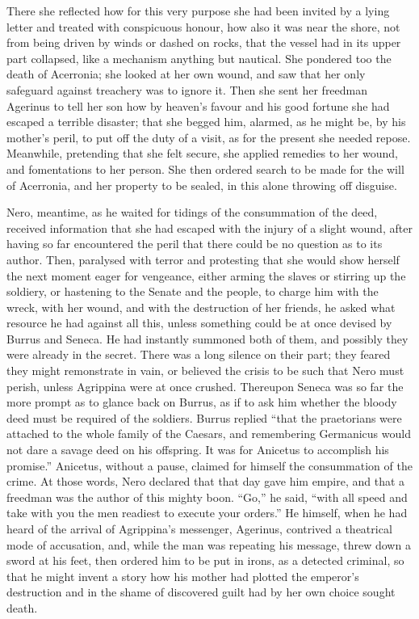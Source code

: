 
There she reflected how for this very purpose she had been invited by a lying letter and treated with conspicuous honour, how also it was near the shore, not from being driven by winds or dashed on rocks, that the vessel had in its upper part collapsed, like a mechanism anything but nautical. She pondered too the death of Acerronia; she looked at her own wound, and saw that her only safeguard against treachery was to ignore it. Then she sent her freedman Agerinus to tell her son how by heaven's favour and his good fortune she had escaped a terrible disaster; that she begged him, alarmed, as he might be, by his mother's peril, to put off the duty of a visit, as for the present she needed repose. Meanwhile, pretending that she felt secure, she applied remedies to her wound, and fomentations to her person. She then ordered search to be made for the will of Acerronia, and her property to be sealed, in this alone throwing off disguise.


Nero, meantime, as he waited for tidings of the consummation of the deed, received information that she had escaped with the injury of a slight wound, after having so far encountered the peril that there could be no question as to its author. Then, paralysed with terror and protesting that she would show herself the next moment eager for vengeance, either arming the slaves or stirring up the soldiery, or hastening to the Senate and the people, to charge him with the wreck, with her wound, and with the destruction of her friends, he asked what resource he had against all this, unless something could be at once devised by Burrus and Seneca. He had instantly summoned both of them, and possibly they were already in the secret. There was a long silence on their part; they feared they might remonstrate in vain, or believed the crisis to be such that Nero must perish, unless Agrippina were at once crushed. Thereupon Seneca was so far the more prompt as to glance back on Burrus, as if to ask him whether the bloody deed must be required of the soldiers. Burrus replied ``that the praetorians were attached to the whole family of the Caesars, and remembering Germanicus would not dare a savage deed on his offspring. It was for Anicetus to accomplish his promise.'' Anicetus, without a pause, claimed for himself the consummation of the crime. At those words, Nero declared that that day gave him empire, and that a freedman was the author of this mighty boon. ``Go,'' he said, ``with all speed and take with you the men readiest to execute your orders.'' He himself, when he had heard of the arrival of Agrippina's messenger, Agerinus, contrived a theatrical mode of accusation, and, while the man was repeating his message, threw down a sword at his feet, then ordered him to be put in irons, as a detected criminal, so that he might invent a story how his mother had plotted the emperor's destruction and in the shame of discovered guilt had by her own choice sought death.

